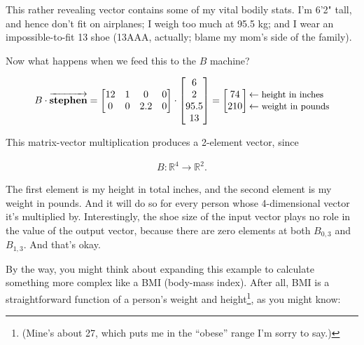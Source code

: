 This rather revealing vector contains some of my vital bodily stats. I'm 6'2"
tall, and hence don't fit on airplanes; I weigh too much at 95.5 kg; and I wear
an impossible-to-fit 13 shoe (13AAA, actually; blame my mom's side of the
family).

Now what happens when we feed this to the $B$ machine?

\vspace{-.15in}
\begin{align*}
B \cdot \overrightarrow{\textbf{stephen}} =
\begin{bmatrix}
12 & 1 & 0 & 0 \\
0 & 0 & 2.2 & 0 \\
\end{bmatrix} \cdot
\begin{bmatrix}
6 \\ 2 \\ 95.5 \\ 13 \\
\end{bmatrix} =
\begin{bmatrix}
74 \\ 210 \\
\end{bmatrix}
\begin{matrix*}[l]
\leftarrow \textrm{\small{height in inches}} \\
\leftarrow \textrm{\small{weight in pounds}} \\
\end{matrix*}
\end{align*}
\vspace{-.15in}

This matrix-vector multiplication produces a 2-element vector, since

\vspace{-.15in}
\begin{align*}
B : \mathbb{R}^4 \rightarrow \mathbb{R}^2.
\end{align*}
\vspace{-.15in}

The first element is my height in total inches, and the second element is my
weight in pounds. And it will do so for every person whose 4-dimensional vector
it's multiplied by. Interestingly, the shoe size of the input vector plays no
role in the value of the output vector, because there are zero elements at both
$B_{0,3}$ and $B_{1,3}$. And that's okay.

\smallskip
{}

By the way, you might think about expanding this example to calculate something
more complex like a BMI (body-mass index). After all, BMI is a straightforward
function of a person's weight and height\footnote{(Mine's about 27, which puts
me in the ``obese'' range I'm sorry to say.)}, as you might know:

